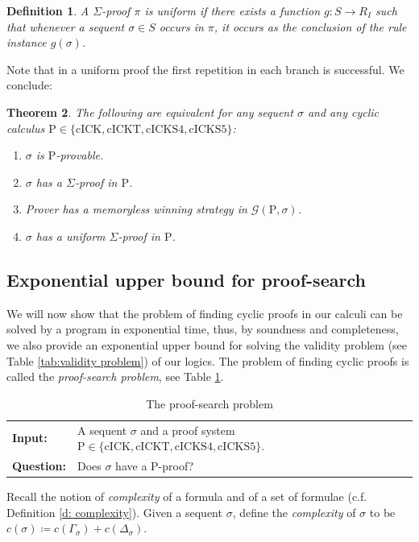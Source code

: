 \documentclass{myifcolog}
\newcommand{\hickp}{\mathrm{P}}
\newcommand{\cick}{\mathrm{cICK}}
\newcommand{\cickt}{\mathrm{cICKT}}
\newcommand{\cicks}{\mathrm{cICKS4}}
\newcommand{\cickss}{\mathrm{cICKS5}}
\newtheorem{theorem}{Theorem}
\newtheorem{definition}[theorem]{Definition}
\numberwithin{theorem}{section}
\begin{document}
	\begin{definition}
		A $\Sigma$-proof $\pi$ is \emph{uniform} if there exists a function $g: S \longrightarrow R_I$ such that whenever a sequent $\sigma \in S$ occurs in $\pi$, it occurs as the conclusion of the rule instance $g(\sigma)$.
	\end{definition}
   Note that in a uniform proof the first repetition in each branch is successful. We conclude:
	\begin{theorem}\label{t: strategy iff provable}
		The following are equivalent for any sequent $\sigma$ and any cyclic calculus $\hickp \in \{\cick, \cickt, \cicks, \cickss\}$:
		\begin{enumerate}
			\item $\sigma$ is $\hickp$-provable.
            \item $\sigma$ has a $\Sigma$-proof in $\hickp$.
			\item Prover has a memoryless winning strategy in $\mathscr{G}(\hickp,\sigma)$.
			\item $\sigma$ has a uniform $\Sigma$-proof in $\hickp$.
		\end{enumerate}
	\end{theorem}


\subsection{Exponential upper bound for proof-search}\label{s: complexity}

We will now show that the problem of finding cyclic proofs in our calculi can be solved by a program in exponential time, thus, by soundness and completeness, we also provide an exponential upper bound for solving the validity problem (see Table \ref{tab:validity problem}) of our logics. The problem of finding cyclic proofs is called the \emph{proof-search problem}, see Table \ref{tab:proof-search problem}.


\begin{table}[t]
    \centering
    \begin{tabular}{|l l|}
    \hline
        \textbf{Input:} &  A sequent $\sigma$ and a proof system $\hickp \in \{\cick, \cickt, \cicks, \cickss\}$. \\
         \textbf{Question:} &  Does $\sigma$ have a $\hickp$-proof? \\
         \hline
    \end{tabular}
    \caption{The proof-search problem}
    \label{tab:proof-search problem}
\end{table}
Recall the notion of \emph{complexity} of a formula and of a set of formulae (c.f. Definition \ref{d: complexity}). Given a sequent $\sigma$, define the \emph{complexity} of $\sigma$ to be $c(\sigma) \coloneqq c(\Gamma_\sigma) + c(\Delta_\sigma)$.
\end{document}
